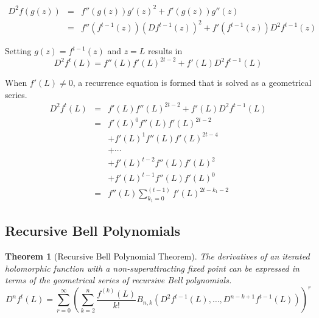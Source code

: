 \documentclass{article}
\newtheorem{theorem}{Theorem}
\theoremstyle{definition}
\begin{document}
\begin{eqnarray*}
	D^2f(g(z))&=&f''(g(z))g'(z)^2+f'(g(z))g''(z)\\
	        &=&f''(f^{t-1}(z))(Df^{t-1}(z))^2+f'(f^{t-1}(z))D^2f^{t-1}(z)
\end{eqnarray*}


Setting $g(z) = f^{t-1}(z)$ and $z=L$ results in
$$D^2f^t(L) = f''(L) f'(L)^{2t-2}+f'(L) D^2f^{t-1}(L)$$

When $f'(L) \neq 0$, a recurrence equation is formed that is solved as a geometrical series. 
\begin{eqnarray}	           
 D^2f^t(L)&=&f'(L)f''(L)^{2t-2}+f'(L) D^2f^{t-1}(L)\nonumber\\
            &=&f'(L)^0f''(L) f'(L)^{2t-2}\nonumber\\
            &&+f'(L)^1f''(L) f'(L)^{2t-4}\nonumber\\
            &&+\cdots\nonumber\\
            &&+f'(L)^{t-2}f''(L) f'(L)^2\nonumber\\
            &&+f'(L)^{t-1}f''(L) f'(L)^0\nonumber\\
            &=&f''(L)\sum_{k_1=0}^{(t-1)}f'(L)^{2t-k_1-2}
 \label{eq:TheSecondDerivative}            
\end{eqnarray}

\subsection{Recursive Bell Polynomials}

\begin{theorem}[Recursive Bell Polynomial Theorem]
The derivatives of an iterated holomorphic function with a non-superattracting fixed point can be expressed in terms of the geometrical series of recursive Bell polynomials.
$$D^nf^t(L)=\sum_{r=0}^\infty(\sum_{k=2}^n \frac{f^{(k)}(L)}{k!} B_{n,k}(D^2f^{t-1}(L),\ldots, D^{n-k+1}f^{t-1}(L)))^r$$
\end{theorem}
\end{document}
